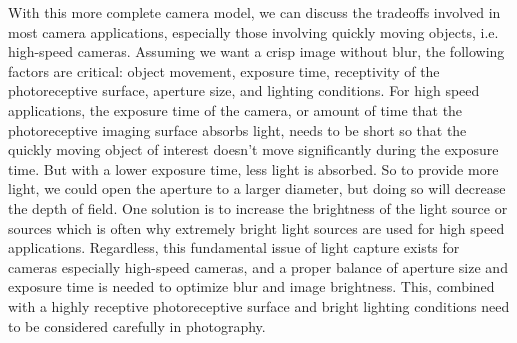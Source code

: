 With this more complete camera model, we can discuss the tradeoffs involved in most camera applications, especially those involving quickly moving objects, i.e. high-speed cameras. Assuming we want a crisp image without blur, the following factors are critical: object movement, exposure time, receptivity of the photoreceptive surface, aperture size, and lighting conditions. For high speed applications, the exposure time of the camera, or amount of time that the photoreceptive imaging surface absorbs light, needs to be short so that the quickly moving object of interest doesn't move significantly during the exposure time. But with a lower exposure time, less light is absorbed. So to provide more light, we could open the aperture to a larger diameter, but doing so will decrease the depth of field. One solution is to increase the brightness of the light source or sources which is often why extremely bright light sources are used for high speed applications. Regardless, this fundamental issue of light capture exists for cameras especially high-speed cameras, and a proper balance of aperture size and exposure time is needed to optimize blur and image brightness. This, combined with a highly receptive photoreceptive surface and bright lighting conditions need to be considered carefully in photography.


